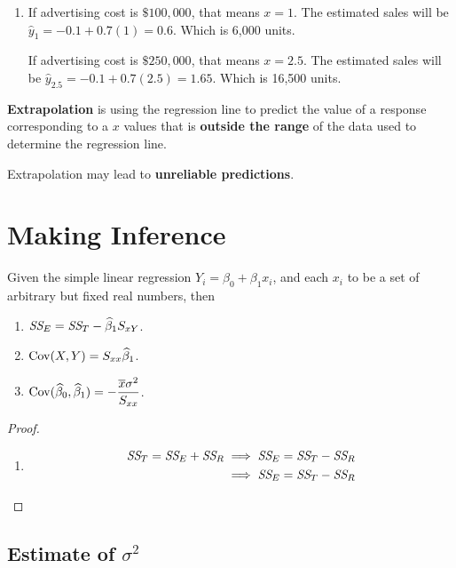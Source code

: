 \begin{solution}
\begin{enumerate}
    \item If advertising cost is $\$100,000$, that means $x=1$. The estimated sales will be $\widehat{y}_{1} = -0.1 + 0.7(1) = 0.6$. Which is 6,000 units.

    If advertising cost is $\$250,000$, that means $x=2.5$. The estimated sales will be $\widehat{y}_{2.5} = -0.1 + 0.7(2.5) = 1.65$. Which is 16,500 units.
    \end{enumerate}
\end{solution}

\begin{definition}[Extrapolation]
    \textbf{Extrapolation} is using the regression line to predict the value of a response corresponding to a $x$ values 
    that is \textbf{outside the range} of the data used to determine the regression line.

    Extrapolation may lead to \textbf{unreliable predictions}.
\end{definition}

\section{Making Inference}

\begin{lemma}
    Given the simple linear regression $Y_i = \beta_0 + \beta_1 x_i$, and each 
    $x_i$ to be a set of arbitrary but fixed real numbers, then 
    \begin{enumerate}
        \item $\textit{SS}_{E} = \textit{SS}_{T} - \widehat{\beta}_1 S_{xY}$.
        \item $\operatorname*{Cov}({X,Y}) = S_{xx} \widehat{\beta}_1$.
        \item $\displaystyle \operatorname*{Cov}({\widehat{\beta}_0, \widehat{\beta}_1}) = -\frac{\overline{x} \sigma^2}{S_{xx}}$.
    \end{enumerate}
\end{lemma}
\begin{proof}
    \begin{enumerate}
        \item \begin{align*}
            \textit{SS}_{T} = \textit{SS}_{E} + \textit{SS}_{R} &\implies \textit{SS}_{E} = \textit{SS}_{T} - \textit{SS}_{R}\\
            &\implies \textit{SS}_{E} = \textit{SS}_{T} - \textit{SS}_{R}
        \end{align*}
    \end{enumerate}
\end{proof}

\subsection{Estimate of $\sigma^2$}

